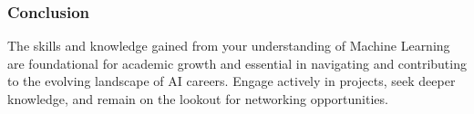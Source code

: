 \documentclass{beamer}
\begin{document}
\begin{frame}[fragile]
    \frametitle{Conclusion}
    The skills and knowledge gained from your understanding of Machine Learning are foundational for academic growth and essential in navigating and contributing to the evolving landscape of AI careers. Engage actively in projects, seek deeper knowledge, and remain on the lookout for networking opportunities.
\end{frame}
\end{document}
